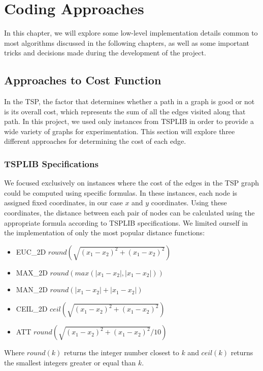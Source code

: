 \chapter{Coding Approaches}

In this chapter, we will explore some low-level implementation details common to most algorithms discussed in the following chapters, as well as some important tricks and decisions made during the development of the project.

\section{Approaches to Cost Function}

In the TSP, the factor that determines whether a path in a graph is good or not is its overall cost, which represents the sum of all the edges visited along that path.
In this project, we used only instances from TSPLIB\cite{tsplib} in order to provide a wide variety of graphs for experimentation.
This section will explore three different approaches for determining the cost of each edge.

\subsection{TSPLIB Specifications}

We focused exclusively on instances where the cost of the edges in the TSP graph could be computed using specific formulas.
In these instances, each node is assigned fixed coordinates, in our case $x$ and $y$ coordinates.
Using these coordinates, the distance between each pair of nodes can be calculated using the appropriate formula according to TSPLIB specifications.
We limited ourself in the implementation of only the most popular distance functions:
\begin{itemize}
    \item EUC\_2D $round(\sqrt{(x_1 - x_2)^2 + (x_1 - x_2)^2})$
    \item MAX\_2D $round(max(|x_1 - x_2|,|x_1 - x_2|))$
    \item MAN\_2D $round(|x_1 - x_2| + |x_1 - x_2|)$
    \item CEIL\_2D $ceil(\sqrt{(x_1 - x_2)^2 + (x_1 - x_2)^2})$
    \item ATT \qquad $round(\sqrt{(x_1 - x_2)^2 + (x_1 - x_2)^2}/10)$
\end{itemize}
Where $round(k)$ returns the integer number closest to $k$ and $ceil(k)$ returns the smallest integers greater or equal than $k$.

